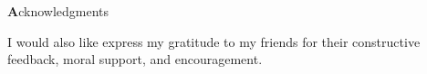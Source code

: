 
\vspace*{2cm}

\begin{center}
{ \textbf Acknowledgments}
\end{center}

\vspace{1cm}
 
I would also like express my gratitude to my friends for their constructive feedback, moral support, and encouragement.

\cleardoublepage{}
